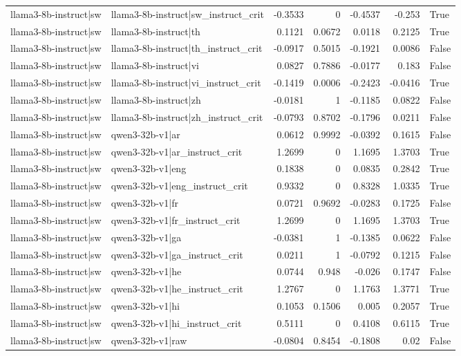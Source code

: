 \begin{table}
\begin{tabular}{l l r r r r l}
llama3-8b-instruct|sw & llama3-8b-instruct|sw_instruct_crit & -0.3533 & 0 & -0.4537 & -0.253 & True \\
llama3-8b-instruct|sw & llama3-8b-instruct|th & 0.1121 & 0.0672 & 0.0118 & 0.2125 & True \\
llama3-8b-instruct|sw & llama3-8b-instruct|th_instruct_crit & -0.0917 & 0.5015 & -0.1921 & 0.0086 & False \\
llama3-8b-instruct|sw & llama3-8b-instruct|vi & 0.0827 & 0.7886 & -0.0177 & 0.183 & False \\
llama3-8b-instruct|sw & llama3-8b-instruct|vi_instruct_crit & -0.1419 & 0.0006 & -0.2423 & -0.0416 & True \\
llama3-8b-instruct|sw & llama3-8b-instruct|zh & -0.0181 & 1 & -0.1185 & 0.0822 & False \\
llama3-8b-instruct|sw & llama3-8b-instruct|zh_instruct_crit & -0.0793 & 0.8702 & -0.1796 & 0.0211 & False \\
llama3-8b-instruct|sw & qwen3-32b-v1|ar & 0.0612 & 0.9992 & -0.0392 & 0.1615 & False \\
llama3-8b-instruct|sw & qwen3-32b-v1|ar_instruct_crit & 1.2699 & 0 & 1.1695 & 1.3703 & True \\
llama3-8b-instruct|sw & qwen3-32b-v1|eng & 0.1838 & 0 & 0.0835 & 0.2842 & True \\
llama3-8b-instruct|sw & qwen3-32b-v1|eng_instruct_crit & 0.9332 & 0 & 0.8328 & 1.0335 & True \\
llama3-8b-instruct|sw & qwen3-32b-v1|fr & 0.0721 & 0.9692 & -0.0283 & 0.1725 & False \\
llama3-8b-instruct|sw & qwen3-32b-v1|fr_instruct_crit & 1.2699 & 0 & 1.1695 & 1.3703 & True \\
llama3-8b-instruct|sw & qwen3-32b-v1|ga & -0.0381 & 1 & -0.1385 & 0.0622 & False \\
llama3-8b-instruct|sw & qwen3-32b-v1|ga_instruct_crit & 0.0211 & 1 & -0.0792 & 0.1215 & False \\
llama3-8b-instruct|sw & qwen3-32b-v1|he & 0.0744 & 0.948 & -0.026 & 0.1747 & False \\
llama3-8b-instruct|sw & qwen3-32b-v1|he_instruct_crit & 1.2767 & 0 & 1.1763 & 1.3771 & True \\
llama3-8b-instruct|sw & qwen3-32b-v1|hi & 0.1053 & 0.1506 & 0.005 & 0.2057 & True \\
llama3-8b-instruct|sw & qwen3-32b-v1|hi_instruct_crit & 0.5111 & 0 & 0.4108 & 0.6115 & True \\
llama3-8b-instruct|sw & qwen3-32b-v1|raw & -0.0804 & 0.8454 & -0.1808 & 0.02 & False \\

\end{tabular}
\end{table}
